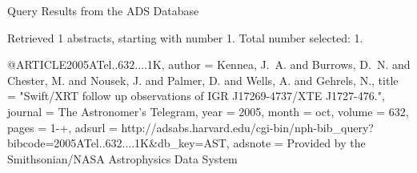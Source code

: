 Query Results from the ADS Database


Retrieved 1 abstracts, starting with number 1.  Total number selected: 1.

@ARTICLE{2005ATel..632....1K,
   author = {{Kennea}, J.~A. and {Burrows}, D.~N. and {Chester}, M. and {Nousek}, J. and 
	{Palmer}, D. and {Wells}, A. and {Gehrels}, N.},
    title = "{Swift/XRT follow up observations of IGR J17269-4737/XTE J1727-476.}",
  journal = {The Astronomer's Telegram},
     year = 2005,
    month = oct,
   volume = 632,
    pages = {1-+},
   adsurl = {http://adsabs.harvard.edu/cgi-bin/nph-bib_query?bibcode=2005ATel..632....1K&db_key=AST},
  adsnote = {Provided by the Smithsonian/NASA Astrophysics Data System}
}


